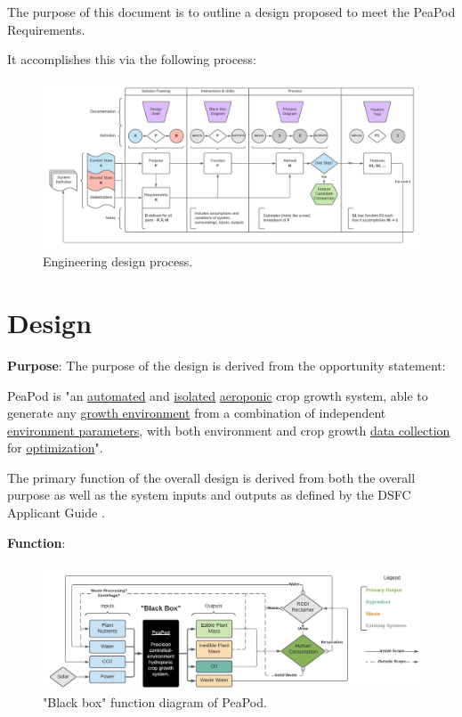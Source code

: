 \documentclass{report}
\begin{document}
The purpose of this document is to outline a design proposed to meet the PeaPod Requirements.

It accomplishes this via the following process:

\begin{figure}[h]
    \centering
    \includegraphics[width=16.5cm]{images/designprocess.png}
    \hfill
    \caption{Engineering design process.}
\end{figure}

\newpage

\section{Design}

\textbf{Purpose}: The purpose of the design is derived from the opportunity statement:

PeaPod is "an \uline{automated} and \uline{isolated} \uline{aeroponic} crop growth system, able to generate any \uline{growth environment} from a combination of independent \uline{environment parameters}, with both environment and crop growth \uline{data collection} for \uline{optimization}".

The primary function of the overall design is derived from both the overall purpose as well as the system inputs and outputs as defined by the DSFC Applicant Guide \cite{applicantguide}.

\textbf{Function}:

\begin{figure}[h]
    \centering
    \includegraphics[width=15cm]{images/blackbox.png}
    \hfill
    \caption{"Black box" function diagram of PeaPod.}
\end{figure}
\end{document}
